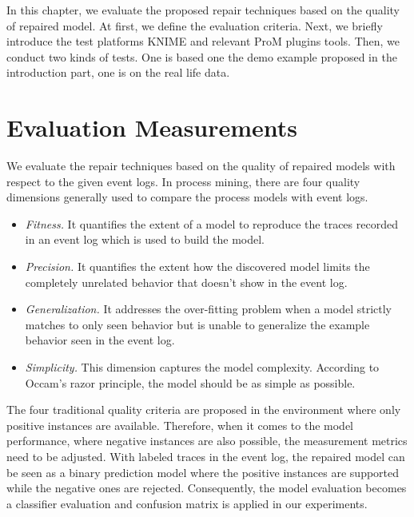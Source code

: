 In this chapter, we evaluate the proposed repair techniques based on the quality of repaired model. At first, we define the evaluation criteria. Next, we briefly introduce the test platforms KNIME and relevant ProM plugins tools. Then, we conduct two kinds of tests. One is based one the demo example proposed in the introduction part, one is on the real life data. 
\section{Evaluation Measurements}
We evaluate the repair techniques based on the quality of repaired models with respect to the given event logs. In process mining, there are four quality dimensions generally used to compare the process models with event logs. 
\begin{itemize}
	\item \emph{Fitness.} It quantifies the extent of a model to reproduce the traces recorded in an event log which is used to build the model.   
	\item \emph{Precision.} It quantifies the extent how the discovered model limits the completely unrelated behavior that doesn't show in the event log. 
	\item \emph{Generalization.} It addresses the over-fitting problem when a model strictly matches to only seen behavior but is unable to generalize the example behavior seen in the event log. 
	\item \emph{Simplicity.} This dimension captures the model complexity. According to Occam's razor principle, the model should be as simple as possible.
\end{itemize}
The four traditional quality criteria are proposed in the environment where only positive instances are available. Therefore, when it comes to the model performance, where negative instances are also possible, the measurement metrics need to be adjusted. With labeled traces in the event log, the repaired model can be seen as a binary prediction model where the positive instances are supported while the negative ones are rejected. Consequently, the model evaluation becomes a classifier evaluation and confusion matrix is applied in our experiments.


